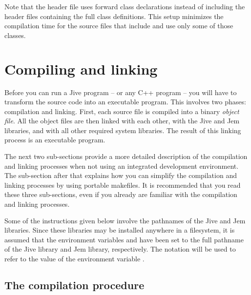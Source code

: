 
Note that the header file  uses forward class declarations
instead of including the header files containing the full class
definitions. This setup minimizes the compilation time for the source
files that include  and use only some of those
classes.


\section{Compiling and linking}
\label{section:the-basics:compilation}

Before you can run a Jive program -- or any C++ program -- you will have
to transform the source code into an executable program. This involves
two phases: compilation and linking. First, each source file is compiled
into a binary \emph{object file}. All the object files are then linked
with each other, with the Jive and Jem libraries, and with all other
required system libraries. The result of this linking process is an
executable program.

The next two sub-sections provide a more detailed description of the
compilation and linking processes when not using an integrated
development environment. The sub-section after that explains how you can
simplify the compilation and linking processes by using portable
makefiles. It is recommended that you read these three sub-sections, even
if you already are familiar with the compilation and linking
processes.

Some of the instructions given below involve the pathnames of the Jive
and Jem libraries. Since these libraries may be installed anywhere in a
filesystem, it is assumed that the environment variables 
and  have been set to the full pathname of the Jive library
and Jem library, respectively. The notation  will be used
to refer to the value of the environment variable .


\subsection*{The compilation procedure}

